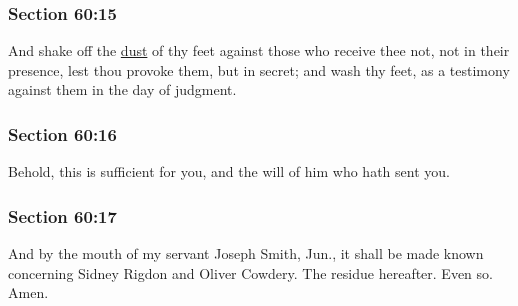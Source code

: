 	\subsubsection{Section 60:15} %
		\label{DC60-15}

		And shake off the \hyperref[DUST]{dust} of thy feet against those who receive thee not, not in their presence, lest thou provoke them, but in secret; and wash thy feet, as a testimony against them in the day of judgment.


	\subsubsection{Section 60:16} %
		\label{DC60-16}

		Behold, this is sufficient for you, and the will of him who hath sent you.


	\subsubsection{Section 60:17} %
		\label{DC60-17}

		And by the mouth of my servant Joseph Smith, Jun., it shall be made known concerning Sidney Rigdon and Oliver Cowdery.  The residue hereafter.  Even so.  Amen.

